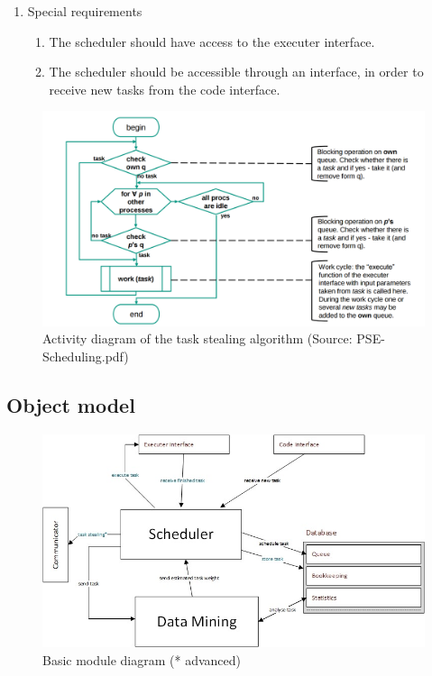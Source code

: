 \begin{enumerate}[1. ]
	\item Special requirements
	
	\begin{enumerate}
	\item The scheduler should have access to the executer interface.
	\item The scheduler should be accessible through an interface, in order to receive new tasks from the code interface.
	\end{enumerate}

\end{enumerate}
\begin{figure}
	\includegraphics[width=15cm]{images/task_stealing_pap.jpg}
	\caption{Activity diagram of the task stealing algorithm (Source: PSE-Scheduling.pdf)}
\end{figure}

\subsection{Object model}
	\begin{figure}[H]
		\includegraphics[width=15cm]{images/modules.jpg}
		\caption{Basic module diagram (* advanced)}
	\end{figure}

